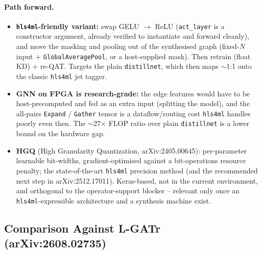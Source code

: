 \paragraph{Path forward.}
\begin{itemize}
    \item \textbf{\texttt{hls4ml}-friendly variant:} swap GELU $\to$ ReLU
    (\texttt{act\_layer} is a constructor argument, already verified to
    instantiate and forward cleanly), and move the masking and pooling out
    of the synthesised graph (fixed-$N$ input $+$ \texttt{GlobalAveragePool},
    or a host-supplied mask). Then retrain (float KD) $+$ re-QAT. Targets
    the plain \texttt{distillnet}, which then maps $\sim$1:1 onto the
    classic \texttt{hls4ml} jet tagger.
    \item \textbf{GNN on FPGA is research-grade:} the edge features would
    have to be host-precomputed and fed as an extra input (splitting the
    model), and the all-pairs \texttt{Expand} / \texttt{Gather} tensor is a
    dataflow/routing cost \texttt{hls4ml} handles poorly even then. The
    $\sim$27$\times$ FLOP ratio over plain \texttt{distillnet} is a lower
    bound on the hardware gap.
    \item \textbf{HGQ} (High Granularity Quantization, arXiv:2405.00645):
    per-parameter learnable bit-widths, gradient-optimised against a
    bit-operations resource penalty; the state-of-the-art \texttt{hls4ml}
    precision method (and the recommended next step in arXiv:2512.17011).
    Keras-based, not in the current environment, and orthogonal to the
    operator-support blocker -- relevant only once an
    \texttt{hls4ml}-expressible architecture and a synthesis machine
    exist.
\end{itemize}

\subsection{Comparison Against L-GATr (arXiv:2608.02735)}
\label{sec:lgatr-comparison}


